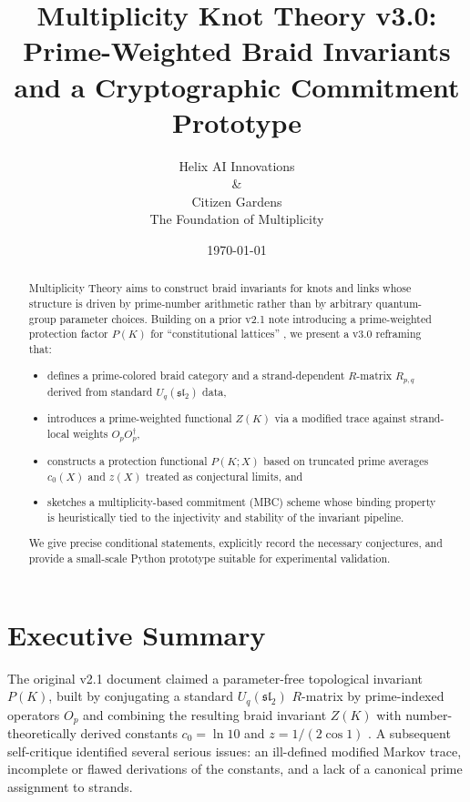\documentclass[11pt]{article}
\title{Multiplicity Knot Theory v3.0:\\
Prime-Weighted Braid Invariants and a Cryptographic Commitment Prototype}
\author{Helix AI Innovations\\ \& \\ Citizen Gardens \\ The Foundation of Multiplicity}
\date{\today}
\begin{document}
\maketitle

\begin{abstract}
Multiplicity Theory aims to construct braid invariants for knots and links whose structure is driven by prime-number arithmetic rather than by arbitrary quantum-group parameter choices. Building on a prior v2.1 note introducing a prime-weighted protection factor $P(K)$ for ``constitutional lattices'' \cite{MTv21}, we present a v3.0 reframing that:

\begin{itemize}
  \item defines a prime-colored braid category and a strand-dependent $R$-matrix $R_{p,q}$ derived from standard $U_q(\mathfrak{sl}_2)$ data,
  \item introduces a prime-weighted functional $Z(K)$ via a modified trace against strand-local weights $O_p O_p^\dagger$,
  \item constructs a protection functional $P(K;X)$ based on truncated prime averages $c_0(X)$ and $z(X)$ treated as conjectural limits, and
  \item sketches a multiplicity-based commitment (MBC) scheme whose binding property is heuristically tied to the injectivity and stability of the invariant pipeline.
\end{itemize}

We give precise conditional statements, explicitly record the necessary conjectures, and provide a small-scale Python prototype suitable for experimental validation.
\end{abstract}
 \newpage
\tableofcontents
\newpage

\section{Executive Summary}

The original v2.1 document claimed a parameter-free topological invariant $P(K)$, built by conjugating a standard $U_q(\mathfrak{sl}_2)$ $R$-matrix by prime-indexed operators $O_p$ and combining the resulting braid invariant $Z(K)$ with number-theoretically derived constants $c_0 = \ln 10$ and $z = 1/(2\cos 1)$ \cite{MTv21}. A subsequent self-critique identified several serious issues: an ill-defined modified Markov trace, incomplete or flawed derivations of the constants, and a lack of a canonical prime assignment to strands.
\end{document}
